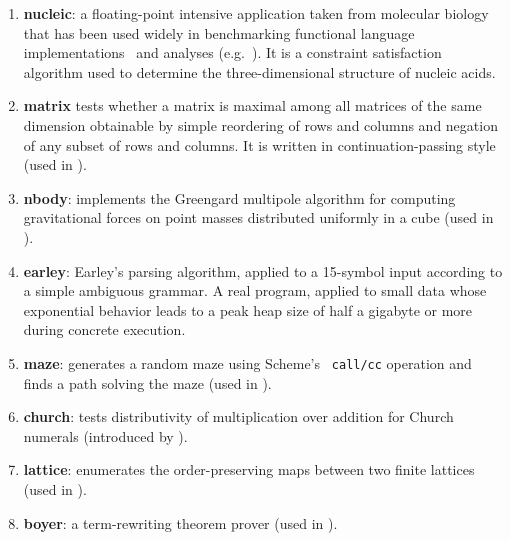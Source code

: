 \documentclass[preprint,onecolumn,9pt]{sigplanconf} %
\begin{document}
\begin{enumerate}  %

\item {\bf nucleic}: a floating-point intensive application taken from
  molecular biology that has been used widely in benchmarking
  functional language
  implementations~\cite{dvanhorn:Hartel1996Benchmarking} and analyses
  (e.g.~\cite{dvanhorn:wright-jagannathan-toplas98,dvanhorn:jagannathan-etal-popl98}).
  It is a constraint satisfaction algorithm used to determine the
  three-dimensional structure of nucleic acids.

\item {\bf matrix} tests whether a matrix is maximal among all
  matrices of the same dimension obtainable by simple reordering of
  rows and columns and negation of any subset of rows and columns.  It
  is written in continuation-passing style (used in
  \cite{dvanhorn:wright-jagannathan-toplas98,dvanhorn:jagannathan-etal-popl98}).


\item {\bf nbody}: implements the Greengard multipole algorithm for
  computing gravitational forces on point masses distributed uniformly
  in a cube (used in
  \cite{dvanhorn:wright-jagannathan-toplas98,dvanhorn:jagannathan-etal-popl98}).

\item {\bf earley}: Earley's parsing algorithm, applied to a 15-symbol
  input according to a simple ambiguous grammar.  A real program,
  applied to small data whose exponential behavior leads to a peak
  heap size of half a gigabyte or more during concrete execution.

\item {\bf maze}: generates a random maze using Scheme's {\tt
  call/cc} operation and finds a path solving
  the maze (used in
  \cite{dvanhorn:wright-jagannathan-toplas98,dvanhorn:jagannathan-etal-popl98}).

\item {\bf church}: tests distributivity of multiplication over
  addition for Church numerals (introduced by
  \cite{dvanhorn:Vardoulakis2011CFA2}).

\item {\bf lattice}: enumerates the order-preserving maps between two
  finite lattices (used in
  \cite{dvanhorn:wright-jagannathan-toplas98,dvanhorn:jagannathan-etal-popl98}).

\item {\bf boyer}: a term-rewriting theorem prover (used in
  \cite{dvanhorn:wright-jagannathan-toplas98,dvanhorn:jagannathan-etal-popl98}).


\end{enumerate}
\end{document}
